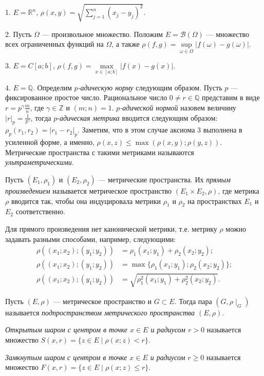 \documentclass[12pt,titlepage, a4paper]{article}
\begin{document}
\prim

1. $E=\mathbb{R}^n$,
$\rho(x,y)=\sqrt{\sum\limits_{j=1}^n(x_j-y_j)^2}$.

2. Пусть $\Omega$ --- произвольное множество. Положим
$E=\mathcal{B}(\Omega)$ --- множество всех ограниченных функций на
$\Omega$, а также
$\rho(f,g)=\sup\limits_{\omega\in\Omega}|f(\omega)-g(\omega)|$.

3. $E=C[a;b]$, $\rho(f,g)=\max\limits_{x\in[a;b]}|f(x)-g(x)|$.

4. $E=\mathbb{Q}$. Определим \emph{$p$-адическую норму} следующим
образом. Пусть $p$ --- фиксированное простое число. Рациональное
число $0\neq r\in\mathbb{Q}$ представим в виде $r=p^\gamma\frac m
n$, где $\gamma\in\mathbb{Z}$ и $(m;n)=1$. \emph{$p$-адической
нормой} назовем величину $|r|_p=\frac{1}{p^\gamma}$, тогда
$p$-\emph{адическая метрика} вводится следующим образом:
$\rho_p(r_1,r_2)=|r_1-r_2|_p$. Заметим, что в этом случае аксиома 3
выполнена в усиленной форме, а именно,
$\rho(x,z)\leqslant\max(\rho(x,y);\rho(y,z))$. Метрические
пространства с такими метриками называются
\emph{ультраметрическими}.

\begin{defen}
Пусть $(E_1,\rho_1)$ и $(E_2,\rho_2)$ --- метрические пространства.
Их \emph{прямым произведением} называется метрическое пространство
$(E_1\times E_2,\rho)$, где метрика $\rho$ вводится так, чтобы она
индуцировала метрики $\rho_1$ и $\rho_2$ на пространствах $E_1$ и
$E_2$ соответственно.
\end{defen}

\begin{zam}
Для прямого произведения нет канонической метрики, т.е. метрику
$\rho$ можно задавать разными способами, например, следующими:
\begin{align*}
\rho((x_1;x_2);(y_1;y_2))&=\rho_1(x_1;y_1)+\rho_2(x_2;y_2);\\
\rho((x_1;x_2);(y_1;y_2))&=\max\{\rho_1(x_1;y_1);\rho_2(x_2;y_2)\};\\
\rho((x_1;x_2);(y_1;y_2))&=\sqrt{\rho_1^2(x_1;y_1)+\rho_2^2(x_2;y_2)}.
\end{align*}
\end{zam}

\begin{defen}
Пусть $(E,\rho)$ --- метрическое пространство и $G\subset E$. Тогда
пара $(G,\rho\mid_G)$ называется \emph{подпространством метрического
пространства $(E,\rho)$}.
\end{defen}

\begin{defen}
\emph{Открытым шаром с центром в точке $x\in E$ и радиусом $r>0$}
называется множество $S(x,r)=\{z\in E\mid\rho(x;z)<r\}$.

\emph{Замкнутым шаром с центром в точке $x\in E$ и радиусом
$r\geqslant0$} называется множество $F(x,r)=\{z\in
E\mid\rho(x;z)\leqslant r\}$.
\end{defen}
\end{document}
